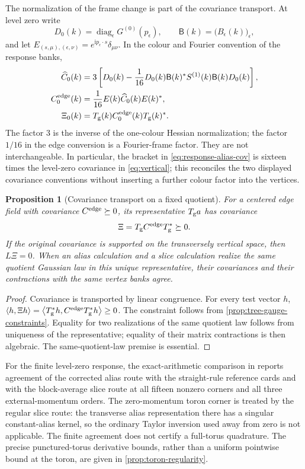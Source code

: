 \documentclass[11pt,oneside,openany]{book}
\newtheorem{proposition}[proposition]{Proposition}
\theoremstyle{definition}
\theoremstyle{remark}
\newcommand{\ii}{\mathrm i}
\newcommand{\diag}{\operatorname{diag}}
\newcommand{\ip}[2]{\left\langle#1,#2\right\rangle}
\newcommand{\src}[2]{\cite[#2]{#1}}
\begin{document}
The normalization of the frame change is part of the covariance transport.
At level zero write
\[
D_0(k)=\diag_{\epsilon}G^{(0)}(p_\epsilon),\qquad
\mathsf B(k)=\bigl(B_\epsilon(k)\bigr)_\epsilon,
\]
and let
$E_{(s,\mu),(\epsilon,\nu)}=e^{\ii p_\epsilon\cdot s}\delta_{\mu\nu}$.
In the colour and Fourier convention of the response banks,
\begin{align}
\widehat C_0(k)
 &=3\left[D_0(k)-\frac1{16}D_0(k)\mathsf B(k)^*
 S^{(1)}(k)\mathsf B(k)D_0(k)\right],
 \label{eq:response-alias-cov}\\
C^{\rm edge}_0(k)&=\frac1{16}E(k)\widehat C_0(k)E(k)^*,
 \label{eq:response-edge-cov}\\
\Xi_0(k)&=T_{\rm g}(k)C^{\rm edge}_0(k)T_{\rm g}(k)^*.
 \label{eq:response-tree-cov}
\end{align}
The factor $3$ is the inverse of the one-colour Hessian normalization; the
factor $1/16$ in the edge conversion is a Fourier-frame factor. They are
not interchangeable. In particular, the bracket in
\cref{eq:response-alias-cov} is sixteen times the level-zero covariance in
\cref{eq:vertical}; this reconciles the two displayed covariance
conventions without inserting a further colour factor into the vertices.

\begin{proposition}[Covariance transport on a fixed quotient]
\label{prop:tree-covariance}
For a centered edge field with covariance $C^{\rm edge}\succeq0$, its
representative $T_{\rm g}a$ has covariance
\[
\Xi=T_{\rm g}C^{\rm edge}T_{\rm g}^*\succeq0.
\]
If the original covariance is supported on the transversely vertical
space, then $L\Xi=0$. When an alias calculation and a slice calculation
realize the same quotient Gaussian law in this unique representative,
their covariances and their contractions with the same vertex banks agree.
\end{proposition}
\begin{proof}
Covariance is transported by linear congruence. For every test vector $h$,
$\ip{h}{\Xi h}=\ip{T_{\rm g}^*h}{C^{\rm edge}T_{\rm g}^*h}\ge0$.
The constraint follows from \cref{prop:tree-gauge-constraints}. Equality
for two realizations of the same quotient law follows from uniqueness of
the representative; equality of their matrix contractions is then
algebraic. The same-quotient-law premise is essential.
\end{proof}

For the finite level-zero response, the exact-arithmetic comparison in
\src{F11}{V41} reports agreement of the corrected alias route with the
straight-rule reference cards and with the block-average slice route at
all fifteen nonzero corners and all three external-momentum orders.
The zero-momentum toron corner is treated by the regular slice route:
the transverse alias representation there has a singular constant-alias
kernel, so the ordinary Taylor inversion used away from zero is not
applicable. The finite agreement does not certify a full-torus quadrature.
The precise punctured-torus derivative bounds, rather than a uniform
pointwise bound at the toron, are given in
\cref{prop:toron-regularity}.
\end{document}
